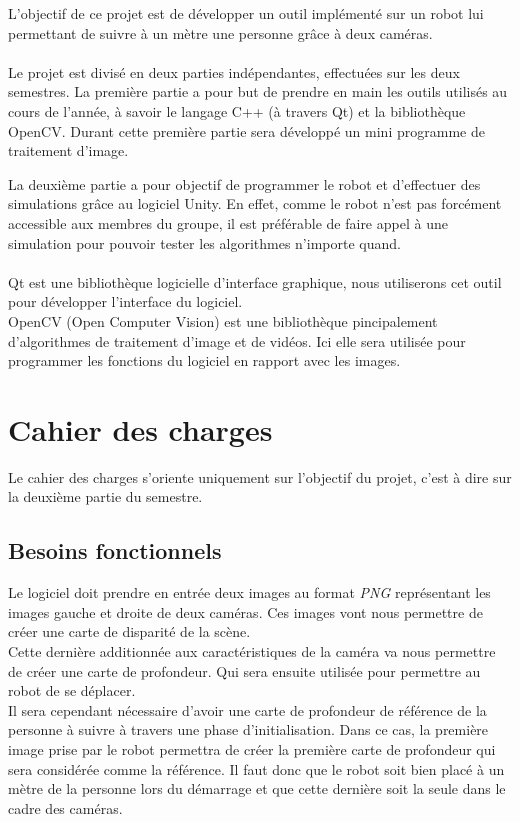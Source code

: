 \documentclass[12pt,a4paper]{report}
\begin{document}
L'objectif de ce projet est de développer un outil implémenté sur un robot lui permettant de suivre à un mètre une personne grâce à deux caméras.\\\\

Le projet est divisé en deux parties indépendantes, effectuées sur les deux semestres. 
La première partie a pour but de prendre en main les outils utilisés au cours de l'année, à savoir le langage C++ (à travers Qt) et la bibliothèque OpenCV.
Durant cette première partie sera développé un mini programme de traitement d'image. 

La deuxième partie a pour objectif de programmer le robot et d'effectuer des simulations grâce au logiciel Unity. En effet, comme le robot n'est pas forcément accessible aux membres du groupe, il est préférable de faire appel à une simulation pour pouvoir tester les algorithmes n'importe quand.\\\\

Qt est une bibliothèque logicielle d'interface graphique, nous utiliserons cet outil pour développer l'interface du logiciel.\\

OpenCV (Open Computer Vision) est une bibliothèque pincipalement d'algorithmes de traitement d'image et de vidéos. Ici elle sera utilisée pour programmer les fonctions du logiciel en rapport avec les images.\\


\section{Cahier des charges}
Le cahier des charges s'oriente uniquement sur l'objectif du projet, c'est à dire sur la deuxième partie du semestre.
\subsection{Besoins fonctionnels}
	Le logiciel doit prendre en entrée deux images au format \textit{PNG} représentant les images gauche et droite de deux caméras.
	Ces images vont nous permettre de créer une carte de disparité de la scène.\\	
	Cette dernière additionnée aux caractéristiques de la caméra va nous permettre de créer une carte de profondeur. Qui sera ensuite utilisée pour permettre au robot de se déplacer.\\
	Il sera cependant nécessaire d'avoir une carte de profondeur de référence de la personne à suivre à travers une phase d'initialisation. Dans ce cas, la première image prise par le robot permettra de créer la première carte de profondeur qui sera considérée comme la référence. Il faut donc que le robot soit bien placé à un mètre de la personne lors du démarrage et que cette dernière soit la seule dans le cadre des caméras.
\end{document}
